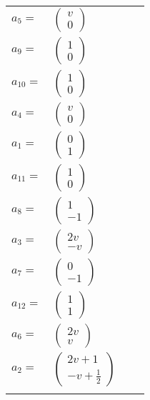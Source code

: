 \documentclass[1p]{elsarticle_modified}
\theoremstyle{definition}
\begin{document}
\begin{tabular}{m{7pt} m{180pt} m{7pt} m{180pt} }
\flushright $a_{5}=$&$\begin{pmatrix}v\\0\end{pmatrix}$ \\
\flushright $a_{9}=$&$\begin{pmatrix}1\\0\end{pmatrix}$ \\
\flushright $a_{10}=$&$\begin{pmatrix}1\\0\end{pmatrix}$ \\
\flushright $a_{4}=$&$\begin{pmatrix}v\\0\end{pmatrix}$ \\
\flushright $a_{1}=$&$\begin{pmatrix}0\\1\end{pmatrix}$ \\
\flushright $a_{11}=$&$\begin{pmatrix}1\\0\end{pmatrix}$ \\
\flushright $a_{8}=$&$\begin{pmatrix}1\\-1\end{pmatrix}$ \\
\flushright $a_{3}=$&$\begin{pmatrix}2 v\\- v\end{pmatrix}$ \\
\flushright $a_{7}=$&$\begin{pmatrix}0\\-1\end{pmatrix}$ \\
\flushright $a_{12}=$&$\begin{pmatrix}1\\1\end{pmatrix}$ \\
\flushright $a_{6}=$&$\begin{pmatrix}2 v\\v\end{pmatrix}$ \\
\flushright $a_{2}=$&$\begin{pmatrix}2 v+1\\- v+\frac{1}{2}\end{pmatrix}$\\&\end{tabular}
\end{document}
